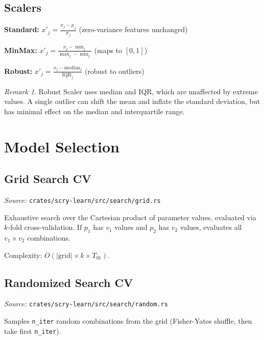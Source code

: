 \documentclass[11pt,a4paper]{article}
\theoremstyle{definition}
\theoremstyle{remark}
\newtheorem{remark}[theorem]{Remark}
\begin{document}
\subsection{Scalers}

\textbf{Standard:} $x'_j = \frac{x_j - \mu_j}{\sigma_j}$ \quad (zero-variance features unchanged)

\textbf{MinMax:} $x'_j = \frac{x_j - \min_j}{\max_j - \min_j}$ \quad (maps to $[0,1]$)

\textbf{Robust:} $x'_j = \frac{x_j - \text{median}_j}{\text{IQR}_j}$ \quad (robust to outliers)

\begin{remark}
Robust Scaler uses median and IQR, which are unaffected by extreme values. A single outlier can shift the mean and inflate the standard deviation, but has minimal effect on the median and interquartile range.
\end{remark}


\section{Model Selection}

\subsection{Grid Search CV}

\noindent\textit{Source:} \texttt{crates/scry-learn/src/search/grid.rs}

Exhaustive search over the Cartesian product of parameter values, evaluated via $k$-fold cross-validation. If $p_1$ has $v_1$ values and $p_2$ has $v_2$ values, evaluates all $v_1 \times v_2$ combinations.

Complexity: $O(|\text{grid}| \times k \times T_{\text{fit}})$.

\subsection{Randomized Search CV}

\noindent\textit{Source:} \texttt{crates/scry-learn/src/search/random.rs}

Samples \texttt{n\_iter} random combinations from the grid (Fisher-Yates shuffle, then take first \texttt{n\_iter}).
\end{document}
